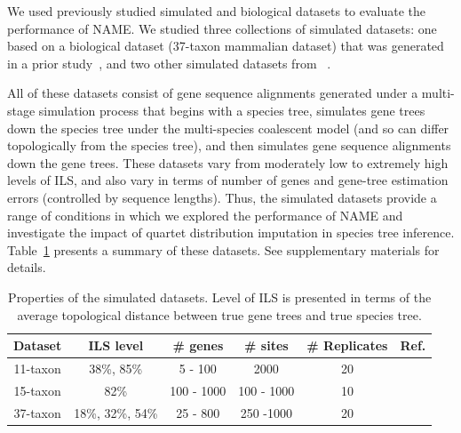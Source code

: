 We used previously studied simulated and biological datasets to evaluate the performance of NAME. We studied three collections of simulated datasets: one based on a biological dataset (37-taxon mammalian dataset) that was
generated in a prior study~\cite{statistical-binning}, and two other simulated datasets from ~\cite{chung2011,statistical-binning}.

All of these datasets consist of gene sequence alignments generated under a multi-stage simulation process that begins with a species tree, simulates gene trees down the species tree under the multi-species coalescent model (and so can differ topologically from the species tree), and then simulates gene sequence alignments down the gene trees.
These datasets
vary from moderately low to extremely high levels of ILS, and also vary in terms of number of genes and gene-tree estimation errors (controlled by sequence lengths). Thus, the simulated datasets provide a range of conditions in which we explored the performance of NAME and investigate the impact of quartet distribution imputation in species tree inference.
Table~\ref{table.data-description} presents a summary of these datasets. See supplementary materials for details.%


\begin{table}[htbp]
\caption{Properties of the simulated datasets. Level of ILS is presented in terms of the average topological distance between true gene trees and true species tree.}
\label{table.data-description}
\centering
\begin{tabular}{c c c c c c} 
 \hline
 Dataset & ILS level & \# genes & \# sites & \# Replicates & Ref.\\  [0.5ex]
 \hline\hline
 11-taxon & 38\%, 85\% & 5 - 100 & 2000 & 20 & \cite{chung2011} \\
 \hline
 15-taxon & 82\% & 100 - 1000 & 100 - 1000 & 10 & \cite{bayzid2015weighted}\\
 \hline
 37-taxon & 18\%, 32\%, 54\% & 25 - 800 & 250 -1000 & 20 & \cite{statistical-binning}\\
 \hline
 
\end{tabular}
\end{table}


